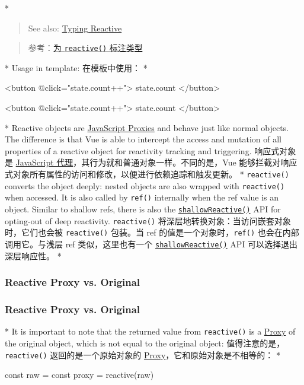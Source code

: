 \begin{paracol}{2}
\switchcolumn[0]*%
\begin{quote}
See also:
\href{https://vuejs.org/guide/typescript/composition-api.html\#typing-reactive}{Typing
Reactive}
\end{quote}
\switchcolumn
\begin{quote}
参考：\href{https://cn.vuejs.org/guide/typescript/composition-api.html\#typing-reactive}{为
\texttt{reactive()} 标注类型}
\end{quote}
\switchcolumn[0]*%
Usage in template:
\switchcolumn
在模板中使用：
\switchcolumn[0]*%
\begin{codeHtml}
<button @click="state.count++">
{{ state.count }}
</button>
\end{codeHtml}
\switchcolumn
\begin{codeHtml}
<button @click="state.count++">
{{ state.count }} 
</button>
\end{codeHtml}
\switchcolumn[0]*%
Reactive objects are
\href{https://developer.mozilla.org/en-US/docs/Web/JavaScript/Reference/Global_Objects/Proxy}{JavaScript
Proxies} and behave just like normal objects. The difference is that Vue
is able to intercept the access and mutation of all properties of a
reactive object for reactivity tracking and triggering.
\switchcolumn
响应式对象是
\href{https://developer.mozilla.org/en-US/docs/Web/JavaScript/Reference/Global_Objects/Proxy}{JavaScript
代理}，其行为就和普通对象一样。不同的是，Vue
能够拦截对响应式对象所有属性的访问和修改，以便进行依赖追踪和触发更新。
\switchcolumn[0]*%
\texttt{reactive()} converts the object deeply: nested objects are also
wrapped with \texttt{reactive()} when accessed. It is also called by
\texttt{ref()} internally when the ref value is an object. Similar to
shallow refs, there is also the
\href{https://vuejs.org/api/reactivity-advanced.html\#shallowreactive}{\texttt{shallowReactive()}}
API for opting-out of deep reactivity.
\switchcolumn
\texttt{reactive()} 将深层地转换对象：当访问嵌套对象时，它们也会被
\texttt{reactive()} 包装。当 ref 的值是一个对象时，\texttt{ref()}
也会在内部调用它。与浅层 ref 类似，这里也有一个
\href{https://cn.vuejs.org/api/reactivity-advanced.html\#shallowreactive}{\texttt{shallowReactive()}}
API 可以选择退出深层响应性。
\switchcolumn[0]*%
\subsubsection{Reactive Proxy vs. Original}
\switchcolumn
\subsubsection{Reactive Proxy vs. Original}
\switchcolumn[0]*%
It is important to note that the returned value from \texttt{reactive()}
is a
\href{https://developer.mozilla.org/en-US/docs/Web/JavaScript/Reference/Global_Objects/Proxy}{Proxy}
of the original object, which is not equal to the original object:
\switchcolumn
值得注意的是，\texttt{reactive()} 返回的是一个原始对象的
\href{https://developer.mozilla.org/en-US/docs/Web/JavaScript/Reference/Global_Objects/Proxy}{Proxy}，它和原始对象是不相等的：
\switchcolumn[0]*%
\begin{codeJs}
const raw = {}
const proxy = reactive(raw)


\end{codeJs}
\end{paracol}
